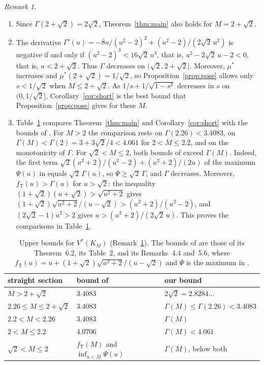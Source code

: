 \documentclass[11pt]{amsart}
\theoremstyle{definition}
\theoremstyle{remark}
\newtheorem{remark}[theorem]{Remark}
\numberwithin{equation}{section}
\begin{document}
\begin{remark}\label{rem:short}
\begin{enumerate}[label=(\alph*)]
\item Since $\Gamma(2+\sqrt2)=2\sqrt2$, Theorem~\ref{thm:main} also holds for $M=2+\sqrt2$.
\item The derivative $\Gamma'(u)=-8u/(u^2-2)^2+(u^2-2)/(2\sqrt2\,u^2)$ is negative if and only if $(u^2-2)^3<16\sqrt2\,u^3$, that is, $u^2-2\sqrt2\,u-2<0$, that is, $u<2+\sqrt2$. Thus $\Gamma$ decreases on $(\sqrt2,2+\sqrt2]$. Moreover, $\mu^*$ increases and $\mu^*(2+\sqrt2)=1/\sqrt2$, so Proposition~\ref{prop:pose} allows only $s<1/\sqrt2$ when $M\le2+\sqrt2$. As $1/s+1/\sqrt{1-s^2}$ decreases in $s$ on $(0,1/\sqrt2]$, Corollary~\ref{cor:short} is the best bound that Proposition~\ref{prop:pose} gives for these $M$.
\item Table~\ref{tab:compare} compares Theorem~\ref{thm:main} and Corollary~\ref{cor:short} with the bounds of \cite{Tan26a}. For $M>2$ the comparison rests on $\Gamma(2.26)<3.4083$, on $\Gamma(M)<\Gamma(2)=3+3\sqrt2/4<4.061$ for $2<M\le2.2$, and on the monotonicity of $\Gamma$. For $\sqrt2<M\le2$, both bounds of \cite{Tan26a} exceed $\Gamma(M)$. Indeed, the first term $\sqrt2(u^2+2)/(u^2-2)+(u^2+2)/(2u)$ of the maximum $\Psi(u)$ in \cite[(5)]{Tan26a} equals $\sqrt2\,\Gamma(u)$, so $\Psi\ge\sqrt2\,\Gamma$, and $\Gamma$ decreases. Moreover, $f_{\mathrm T}(u)>\Gamma(u)$ for $u>\sqrt2$: the inequality $(1+\sqrt2)(u+\sqrt2)>\sqrt{u^2+2}$ gives $(1+\sqrt2)\sqrt{u^2+2}/(u-\sqrt2)>(u^2+2)/(u^2-2)$, and $(2\sqrt2-1)u^2>2$ gives $u>(u^2+2)/(2\sqrt2\,u)$. This proves the comparisons in Table~\ref{tab:compare}.
\end{enumerate}
\end{remark}

\begin{table}[ht]
\centering
\begin{tabular}{lll}
\hline
straight section & bound of \cite{Tan26a} & our bound\\
\hline
$M>2+\sqrt2$ & $3.4083$ & $2\sqrt2=2.8284\ldots$\\
$2.26\le M\le2+\sqrt2$ & $3.4083$ & $\Gamma(M)\le\Gamma(2.26)<3.4083$\\
$2.2<M<2.26$ & $3.4083$ & $\Gamma(M)$\\
$2<M\le2.2$ & $4.0706$ & $\Gamma(M)<4.061$\\
$\sqrt2<M\le2$ & $f_{\mathrm T}(M)$ and $\inf_{u<M}\Psi(u)$ & $\Gamma(M)$, below both\\
\hline
\end{tabular}
\caption{Upper bounds for $V^*(K_M)$ (Remark~\ref{rem:short}). The bounds of \cite{Tan26a} are those of its Theorem~6.2, its Table~2, and its Remarks~4.4 and~5.6, where $f_{\mathrm T}(u)=u+(1+\sqrt2)\sqrt{u^2+2}/(u-\sqrt2)$ and $\Psi$ is the maximum in \cite[(5)]{Tan26a}.}\label{tab:compare}
\end{table}
\end{document}
